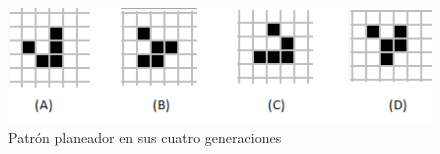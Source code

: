 \begin{figure}[H]
\centering
\includegraphics[scale=1]{imagenes/planeador.png}
\caption{Patrón planeador en sus cuatro generaciones}
\label{fig:planeador}
\end{figure}




